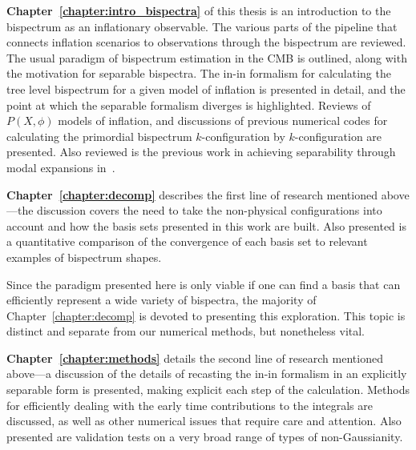 \textbf{Chapter~\ref{chapter:intro_bispectra}} of this thesis
is an introduction to the bispectrum as an inflationary observable.
The various parts of the pipeline that connects inflation scenarios to observations
through the bispectrum are reviewed.
The usual paradigm of bispectrum estimation in the CMB is outlined,
along with the motivation for separable bispectra. The in-in formalism
for calculating the tree level bispectrum for a given model of inflation
is presented in detail, and the point at which the separable formalism diverges is
highlighted.
Reviews of $P(X,\phi)$ models of inflation, and
discussions of previous numerical codes for
calculating the primordial bispectrum $k$-configuration by $k$-configuration
are presented.
Also reviewed is the previous work in achieving separability through modal expansions
in~\cite{Funakoshi}.



\textbf{Chapter~\ref{chapter:decomp}} describes the first line of research mentioned above---the
discussion covers the need to
take the non-physical configurations into account and how the basis sets
presented in this work are built.
Also presented is a quantitative comparison of the convergence of each basis set to
relevant examples of bispectrum shapes.


Since the paradigm presented here is only viable if one can find a basis
that can efficiently represent a wide variety of bispectra,
the majority of Chapter~\ref{chapter:decomp} is devoted to presenting this exploration.
This topic is distinct and separate from our numerical methods, but nonetheless vital.



\textbf{Chapter~\ref{chapter:methods}} details the second line of research mentioned above---a
discussion of the details of recasting the in-in formalism in an explicitly separable form is presented,
making explicit each step of the calculation.
Methods for efficiently dealing with the early time contributions to the integrals are discussed,
as well as other numerical issues that require care and attention.
Also presented are validation tests on a very broad range of types of non-Gaussianity.


